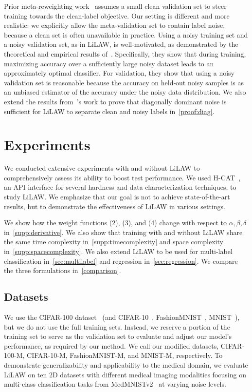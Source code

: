 \documentclass{article}
\theoremstyle{plain}
\theoremstyle{definition}
\theoremstyle{remark}
\begin{document}
Prior meta-reweighting work~\citep{ren_learning_2019} assumes a small clean validation set to steer training towards the clean-label objective. Our setting is different and more realistic: we explicitly allow the meta-validation set to contain label noise, because a clean set is often unavailable in practice. Using a noisy training set and a noisy validation set, as in LiLAW, is well‑motivated, as demonstrated by the theoretical and empirical results of~\citet{chen_robustness}. Specifically, they show that during training, maximizing accuracy over a sufficiently large noisy dataset leads to an approximately optimal classifier. For validation, they show that using a noisy validation set is reasonable because the accuracy on held‑out noisy samples is as an unbiased estimator of the accuracy under the noisy data distribution. We also extend the results from~\citet{gui2021towards}'s work to prove that diagonally dominant noise is sufficient for LiLAW to separate clean and noisy labels in~\ref{proof:diag}.

\section{Experiments}
\label{sec:experiments}

We conducted extensive experiments with and without LiLAW to comprehensively assess its ability to boost test performance. We used H-CAT~\citep{seedat_dissecting_2024}, an API interface for several hardness and data characterization techniques, to study LiLAW. We emphasize that our goal is not to achieve state-of-the-art results, but to demonstrate the effectiveness of LiLAW in various settings. %

We show how the weight functions (2), (3), and (4) change with respect to $\alpha, \beta, \delta$ in~\ref{supp:derivative}. We also show that training with and without LiLAW share the same time complexity in~\ref{supp:timecomplexity} and space complexity in~\ref{supp:spacecomplexity}. We also extend LiLAW to be used for multi-label classification in~\ref{sec:multilabel} and regression in~\ref{sec:regression}. We compare the three formulations in~\ref{comparison}.

\subsection{Datasets}
\label{sec:datasets}

We use the CIFAR-100 dataset~\citep{cifar100} (and CIFAR-10~\citep{cifar10}, FashionMNIST~\citep{fashionmnist}, MNIST~\cite{deng2012mnist}), but we do not use the full training sets. Instead, we reserve a portion of the training set to serve as the validation set to evaluate and adjust our model's performance, as required by our method. We call our modified datasets, CIFAR-100-M, CIFAR-10-M, FashionMNIST-M, and MNIST-M, respectively. To demonstrate generalizability and applicability to the medical domain, we evaluate LiLAW on ten 2D datasets with different medical imaging modalities focusing on multi-class classification tasks from MedMNISTv2~\citep{medmnistv1,medmnistv2,doerrich2024rethinking} at varying noise levels. 
\end{document}

